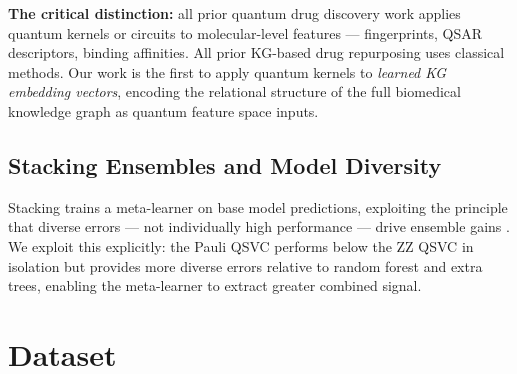 \documentclass[twocolumn,10pt]{article}
\begin{document}
\textbf{The critical distinction:} all prior quantum drug discovery work applies quantum kernels or circuits to molecular-level features --- fingerprints, QSAR descriptors, binding affinities. All prior KG-based drug repurposing uses classical methods. Our work is the first to apply quantum kernels to \textit{learned KG embedding vectors}, encoding the relational structure of the full biomedical knowledge graph as quantum feature space inputs.

\subsection{Stacking Ensembles and Model Diversity}

Stacking trains a meta-learner on base model predictions, exploiting the principle that diverse errors --- not individually high performance --- drive ensemble gains \cite{wolpert1992}. We exploit this explicitly: the Pauli QSVC performs below the ZZ QSVC in isolation but provides more diverse errors relative to random forest and extra trees, enabling the meta-learner to extract greater combined signal.

\section{Dataset}
\end{document}
